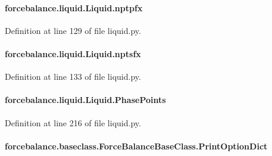 \hypertarget{classforcebalance_1_1liquid_1_1Liquid_a0560795c55fc1b5d7668951c77ad97ab}{
\paragraph[{nptpfx}]{\setlength{\rightskip}{0pt plus 5cm}forcebalance.\-liquid.\-Liquid.\-nptpfx}}\label{classforcebalance_1_1liquid_1_1Liquid_a0560795c55fc1b5d7668951c77ad97ab}


Definition at line 129 of file liquid.\-py.

\hypertarget{classforcebalance_1_1liquid_1_1Liquid_a4125a209929444b7cbfbd60b466dc763}{
\paragraph[{nptsfx}]{\setlength{\rightskip}{0pt plus 5cm}forcebalance.\-liquid.\-Liquid.\-nptsfx}}\label{classforcebalance_1_1liquid_1_1Liquid_a4125a209929444b7cbfbd60b466dc763}


Definition at line 133 of file liquid.\-py.

\hypertarget{classforcebalance_1_1liquid_1_1Liquid_a2c10490d9073a069bd19361f386422ef}{
\paragraph[{Phase\-Points}]{\setlength{\rightskip}{0pt plus 5cm}forcebalance.\-liquid.\-Liquid.\-Phase\-Points}}\label{classforcebalance_1_1liquid_1_1Liquid_a2c10490d9073a069bd19361f386422ef}


Definition at line 216 of file liquid.\-py.

\hypertarget{classforcebalance_1_1baseclass_1_1ForceBalanceBaseClass_a5c55e661e746d1a4443f4e0bc34ebe05}{
\paragraph[{Print\-Option\-Dict}]{\setlength{\rightskip}{0pt plus 5cm}forcebalance.\-baseclass.\-Force\-Balance\-Base\-Class.\-Print\-Option\-Dict\hspace{0.3cm}{\ttfamily [inherited]}}}\label{classforcebalance_1_1baseclass_1_1ForceBalanceBaseClass_a5c55e661e746d1a4443f4e0bc34ebe05}


